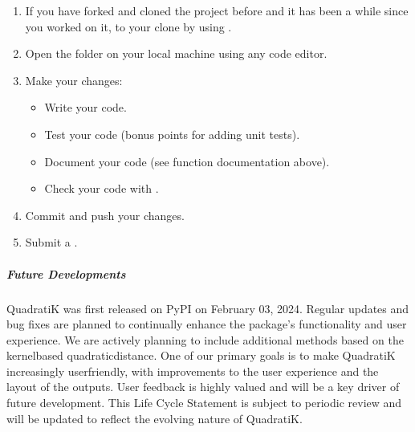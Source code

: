 \documentclass[letterpaper,10pt,english,openany,oneside]{sphinxmanual}
\begin{document}
{{{{\begin{enumerate}
\item {} 
\sphinxAtStartPar
If you have forked and cloned the project before and it has been a while since you worked on it,  to your clone by using .

\item {} 
\sphinxAtStartPar
Open the folder on your local machine using any code editor.

\item {} 
\sphinxAtStartPar
Make your changes:
\begin{itemize}
\item {} 
\sphinxAtStartPar
Write your code.

\item {} 
\sphinxAtStartPar
Test your code (bonus points for adding unit tests).

\item {} 
\sphinxAtStartPar
Document your code (see function documentation above).

\item {} 
\sphinxAtStartPar
Check your code with .

\end{itemize}

\item {} 
\sphinxAtStartPar
Commit and push your changes.

\item {} 
\sphinxAtStartPar
Submit a .

\end{enumerate}


\subparagraph{Future Developments}
\label{\detokenize{development/CONTRIBUTING:future-developments}}
\sphinxAtStartPar
QuadratiK was first released on PyPI on February 03, 2024. Regular updates and bug fixes are planned to continually enhance the package’s functionality and user experience. We are actively planning to include additional methods based on the kernel\sphinxhyphen{}based quadratic\sphinxhyphen{}distance. One of our primary goals is to make QuadratiK increasingly user\sphinxhyphen{}friendly, with improvements to the user experience and the layout of the outputs. User feedback is highly valued and will be a key driver of future development. This Life Cycle Statement is subject to periodic review and will be updated to reflect the evolving nature of QuadratiK.

}}}}
\end{document}
